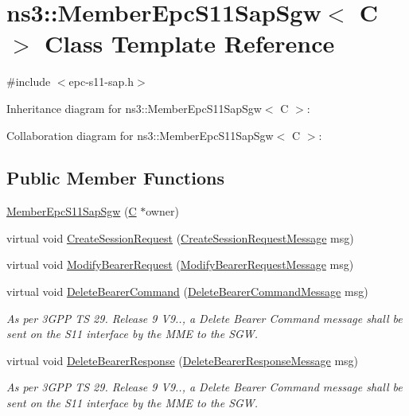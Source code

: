 \hypertarget{classns3_1_1MemberEpcS11SapSgw}{}\section{ns3\+:\+:Member\+Epc\+S11\+Sap\+Sgw$<$ C $>$ Class Template Reference}
\label{classns3_1_1MemberEpcS11SapSgw}


{\ttfamily \#include $<$epc-\/s11-\/sap.\+h$>$}



Inheritance diagram for ns3\+:\+:Member\+Epc\+S11\+Sap\+Sgw$<$ C $>$\+:


Collaboration diagram for ns3\+:\+:Member\+Epc\+S11\+Sap\+Sgw$<$ C $>$\+:
\subsection*{Public Member Functions}
\begin{DoxyCompactItemize}
\item 
\hyperlink{classns3_1_1MemberEpcS11SapSgw_a81fdbaab37fc5d1b12f7fb2d36264742}{Member\+Epc\+S11\+Sap\+Sgw} (\hyperlink{loss__COST231__small__cities__urban_8m_aaa53ca0b650dfd85c4f59fa156f7a2cc}{C} $\ast$owner)
\item 
virtual void \hyperlink{classns3_1_1MemberEpcS11SapSgw_a2057588d5dba8722fda9efc24e588e0f}{Create\+Session\+Request} (\hyperlink{structns3_1_1EpcS11SapSgw_1_1CreateSessionRequestMessage}{Create\+Session\+Request\+Message} msg)
\item 
virtual void \hyperlink{classns3_1_1MemberEpcS11SapSgw_af811ca69d1d7a78f3a132a3491dffad8}{Modify\+Bearer\+Request} (\hyperlink{structns3_1_1EpcS11SapSgw_1_1ModifyBearerRequestMessage}{Modify\+Bearer\+Request\+Message} msg)
\item 
virtual void \hyperlink{classns3_1_1MemberEpcS11SapSgw_a87fd094032447f97fa7fc92cf40a4207}{Delete\+Bearer\+Command} (\hyperlink{structns3_1_1EpcS11SapSgw_1_1DeleteBearerCommandMessage}{Delete\+Bearer\+Command\+Message} msg)
\begin{DoxyCompactList}\small\item\em As per 3\+G\+PP TS 29. Release 9 V9.., a Delete Bearer Command message shall be sent on the S11 interface by the M\+ME to the S\+GW. \end{DoxyCompactList}\item 
virtual void \hyperlink{classns3_1_1MemberEpcS11SapSgw_ad396c81ae86522b760906f8940dc86cf}{Delete\+Bearer\+Response} (\hyperlink{structns3_1_1EpcS11SapSgw_1_1DeleteBearerResponseMessage}{Delete\+Bearer\+Response\+Message} msg)
\begin{DoxyCompactList}\small\item\em As per 3\+G\+PP TS 29. Release 9 V9.., a Delete Bearer Command message shall be sent on the S11 interface by the M\+ME to the S\+GW. \end{DoxyCompactList}\end{DoxyCompactItemize}
